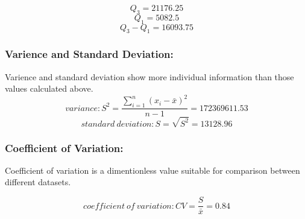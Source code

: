 \documentclass[11pt,a4paper,onside,UTF8]{article}
\begin{document}
\begin{equation}
	Q_3 = 21176.25
\end{equation}
\begin{equation}
	Q_1 = 5082.5
\end{equation}
\begin{equation}
	Q_3-Q_1 = 16093.75
\end{equation}

\subsubsection*{Varience and Standard Deviation:}
Varience and standard deviation show more individual information than those values calculated above.
\begin{equation}
	variance: S^2 = \frac{\sum_{i=1}^{n} \left(x_i-\bar{x}\right)^2}{n-1} = 172369611.53
\end{equation}
\begin{equation}
	standard\ deviation: S = \sqrt{S^2} = 13128.96 
\end{equation}

\subsubsection*{Coefficient of Variation:}
Coefficient of variation is a dimentionless value suitable for comparison between different datasets.

\begin{equation}
	coefficient\ of\ variation: CV = \frac{S}{\bar{x}} =  0.84
\end{equation}
\end{document}
